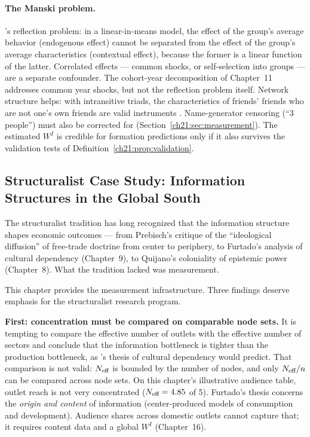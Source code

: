 \documentclass[../structural_economics_book.tex]{subfiles}
\begin{document}
\paragraph{The Manski problem.} \citeauthor{manski1993identification}'s \citeyearpar{manski1993identification} reflection problem: in a linear-in-means model, the effect of the group's average behavior (endogenous effect) cannot be separated from the effect of the group's average characteristics (contextual effect), because the former is a linear function of the latter. Correlated effects --- common shocks, or self-selection into groups --- are a separate confounder. The cohort-year decomposition of Chapter~11 addresses common year shocks, but not the reflection problem itself. Network structure helps: with intransitive triads, the characteristics of friends' friends who are not one's own friends are valid instruments \citep*{bramoulle2009identification}. Name-generator censoring (``3 people'') must also be corrected for (Section~\ref{ch21:sec:measurement}). The estimated $W^I$ is credible for formation predictions only if it also survives the validation tests of Definition~\ref{ch21:prop:validation}.


\subsection*{Structuralist Case Study: Information Structures in the Global South}

The structuralist tradition has long recognized that the information structure shapes economic outcomes --- from Prebisch's critique of the ``ideological diffusion'' of free-trade doctrine from center to periphery, to Furtado's analysis of cultural dependency (Chapter~9), to Quijano's coloniality of epistemic power (Chapter~8). What the tradition lacked was measurement.

This chapter provides the measurement infrastructure. Three findings deserve emphasis for the structuralist research program.

\textbf{First: concentration must be compared on comparable node sets.} It is tempting to compare the effective number of outlets with the effective number of sectors and conclude that the information bottleneck is tighter than the production bottleneck, as \citeauthor{furtado1974mito}'s \citeyearpar{furtado1974mito} thesis of cultural dependency would predict. That comparison is not valid: $N_{\text{eff}}$ is bounded by the number of nodes, and only $N_{\text{eff}}/n$ can be compared across node sets. On this chapter's illustrative audience table, outlet reach is not very concentrated ($N_{\text{eff}} = 4.85$ of 5). Furtado's thesis concerns the \emph{origin and content} of information (center-produced models of consumption and development). Audience shares across domestic outlets cannot capture that; it requires content data and a global $W^I$ (Chapter~16).
\end{document}
